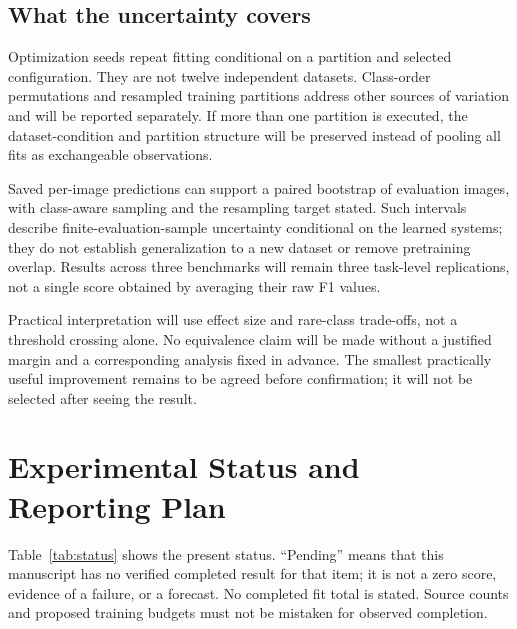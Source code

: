\documentclass[conference]{IEEEtran}
\begin{document}
\subsection{What the uncertainty covers}
Optimization seeds repeat fitting conditional on a partition and selected configuration. They are not twelve independent datasets. Class-order permutations and resampled training partitions address other sources of variation and will be reported separately. If more than one partition is executed, the dataset-condition and partition structure will be preserved instead of pooling all fits as exchangeable observations.

Saved per-image predictions can support a paired bootstrap of evaluation images, with class-aware sampling and the resampling target stated. Such intervals describe finite-evaluation-sample uncertainty conditional on the learned systems; they do not establish generalization to a new dataset or remove pretraining overlap. Results across three benchmarks will remain three task-level replications, not a single score obtained by averaging their raw F1 values.

Practical interpretation will use effect size and rare-class trade-offs, not a threshold crossing alone. No equivalence claim will be made without a justified margin and a corresponding analysis fixed in advance. The smallest practically useful improvement remains to be agreed before confirmation; it will not be selected after seeing the result.

\section{Experimental Status and Reporting Plan}
Table~\ref{tab:status} shows the present status. ``Pending'' means that this manuscript has no verified completed result for that item; it is not a zero score, evidence of a failure, or a forecast. No completed fit total is stated. Source counts and proposed training budgets must not be mistaken for observed completion.
\end{document}
